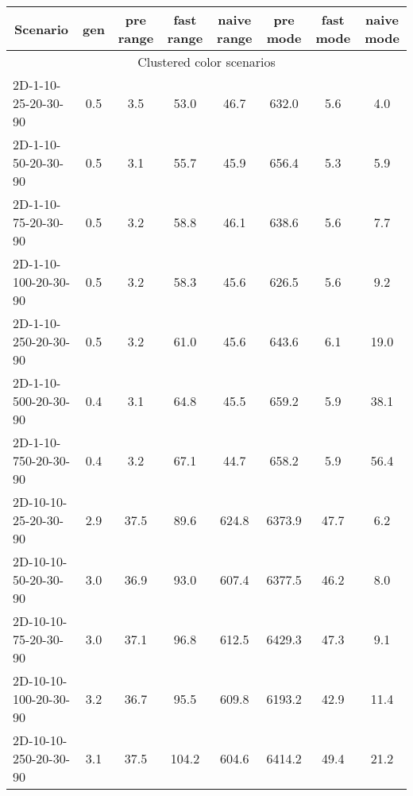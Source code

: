 \documentclass{article}
\begin{document}
    \begin{table}[h]
        \begin{center}
        \begin{tabular}{|l||c|c|c|c|c|c|c|}
            \hline
            \multicolumn{1}{|c|}{Scenario} & gen  & pre range & fast range & naive range & pre mode & fast mode & naive mode \\
            \hline
            \hline
            \multicolumn{8}{|c|}{Clustered color scenarios}                                                                  \\
            \hline
            2D-1-10-25-20-30-90            & 0.5  & 3.5       & 53.0       & 46.7        & 632.0    & 5.6       & 4.0        \\
            2D-1-10-50-20-30-90            & 0.5  & 3.1       & 55.7       & 45.9        & 656.4    & 5.3       & 5.9        \\
            2D-1-10-75-20-30-90            & 0.5  & 3.2       & 58.8       & 46.1        & 638.6    & 5.6       & 7.7        \\
            2D-1-10-100-20-30-90           & 0.5  & 3.2       & 58.3       & 45.6        & 626.5    & 5.6       & 9.2        \\
            2D-1-10-250-20-30-90           & 0.5  & 3.2       & 61.0       & 45.6        & 643.6    & 6.1       & 19.0       \\
            2D-1-10-500-20-30-90           & 0.4  & 3.1       & 64.8       & 45.5        & 659.2    & 5.9       & 38.1       \\
            2D-1-10-750-20-30-90           & 0.4  & 3.2       & 67.1       & 44.7        & 658.2    & 5.9       & 56.4       \\
            \hline
            2D-10-10-25-20-30-90           & 2.9  & 37.5      & 89.6       & 624.8       & 6373.9   & 47.7      & 6.2        \\
            2D-10-10-50-20-30-90           & 3.0  & 36.9      & 93.0       & 607.4       & 6377.5   & 46.2      & 8.0        \\
            2D-10-10-75-20-30-90           & 3.0  & 37.1      & 96.8       & 612.5       & 6429.3   & 47.3      & 9.1        \\
            2D-10-10-100-20-30-90          & 3.2  & 36.7      & 95.5       & 609.8       & 6193.2   & 42.9      & 11.4       \\
            2D-10-10-250-20-30-90          & 3.1  & 37.5      & 104.2      & 604.6       & 6414.2   & 49.4      & 21.2       \\

\end{tabular}
\end{center}
\end{table}
\end{document}
